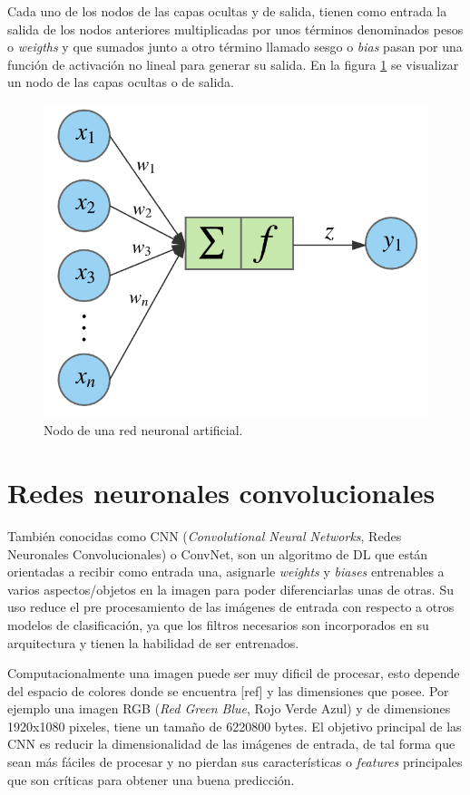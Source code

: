 Cada uno de los nodos de las capas ocultas y de salida, tienen como entrada la salida de los nodos anteriores multiplicadas por unos términos denominados pesos o \textit{weigths} y que sumados junto a otro término llamado sesgo o \textit{bias} pasan por una función de activación no lineal para generar su salida. En la figura \ref{fig:neural_network_node} se visualizar un nodo de las capas ocultas o de salida.
\begin{figure}[h]
	\centering
	\includegraphics[scale=0.25]{./Figures/neural_network_node.png}
	\caption{Nodo de una red neuronal artificial.}
	\label{fig:neural_network_node}
\end{figure}

\section{Redes neuronales convolucionales}
También conocidas como CNN (\textit{Convolutional Neural Networks}, Redes Neuronales Convolucionales) o ConvNet, son un algoritmo de DL que están orientadas a recibir como entrada una, asignarle \textit{weights} y \textit{biases} entrenables a varios aspectos/objetos en la imagen para poder diferenciarlas unas de otras. Su uso reduce el pre procesamiento de las imágenes de entrada con respecto a otros modelos de clasificación, ya que los filtros necesarios son incorporados en su arquitectura y tienen la habilidad de ser entrenados.

Computacionalmente una imagen puede ser muy dificil de procesar, esto depende del espacio de colores donde se encuentra [ref] y las dimensiones que posee. Por ejemplo una imagen RGB (\textit{Red Green Blue}, Rojo Verde Azul) y de dimensiones 1920x1080 pixeles, tiene un tamaño de 6220800 bytes. El objetivo principal de las CNN es reducir la dimensionalidad de las imágenes de entrada, de tal forma que sean más fáciles de procesar y no pierdan sus características o \textit{features} principales que son críticas para obtener una buena predicción.

